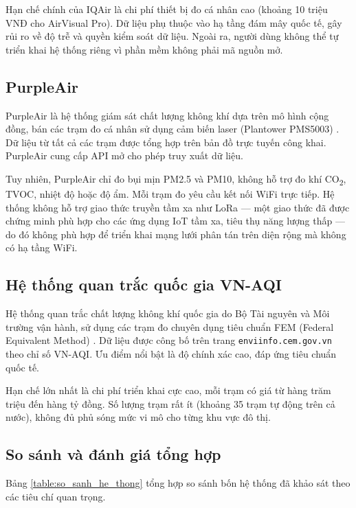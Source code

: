 \documentclass[../DoAn.tex]{subfiles}
\begin{document}
Hạn chế chính của IQAir là chi phí thiết bị đo cá nhân cao (khoảng 10 triệu VNĐ cho AirVisual Pro). Dữ liệu phụ thuộc vào hạ tầng đám mây quốc tế, gây rủi ro về độ trễ và quyền kiểm soát dữ liệu. Ngoài ra, người dùng không thể tự triển khai hệ thống riêng vì phần mềm không phải mã nguồn mở.

\subsection{PurpleAir}
\label{subsection:2.1.3}

PurpleAir là hệ thống giám sát chất lượng không khí dựa trên mô hình cộng đồng, bán các trạm đo cá nhân sử dụng cảm biến laser (Plantower PMS5003) \cite{purpleair2024}. Dữ liệu từ tất cả các trạm được tổng hợp trên bản đồ trực tuyến công khai. PurpleAir cung cấp API mở cho phép truy xuất dữ liệu.

Tuy nhiên, PurpleAir chỉ đo bụi mịn PM2.5 và PM10, không hỗ trợ đo khí CO\textsubscript{2}, TVOC, nhiệt độ hoặc độ ẩm. Mỗi trạm đo yêu cầu kết nối WiFi trực tiếp. Hệ thống không hỗ trợ giao thức truyền tầm xa như LoRa — một giao thức đã được chứng minh phù hợp cho các ứng dụng IoT tầm xa, tiêu thụ năng lượng thấp \cite{augustin2016} — do đó không phù hợp để triển khai mạng lưới phân tán trên diện rộng mà không có hạ tầng WiFi.

\subsection{Hệ thống quan trắc quốc gia VN-AQI}
\label{subsection:2.1.4}

Hệ thống quan trắc chất lượng không khí quốc gia do Bộ Tài nguyên và Môi trường vận hành, sử dụng các trạm đo chuyên dụng tiêu chuẩn FEM (Federal Equivalent Method) \cite{btnmt2023}. Dữ liệu được công bố trên trang \texttt{enviinfo.cem.gov.vn} theo chỉ số VN-AQI. Ưu điểm nổi bật là độ chính xác cao, đáp ứng tiêu chuẩn quốc tế.

Hạn chế lớn nhất là chi phí triển khai cực cao, mỗi trạm có giá từ hàng trăm triệu đến hàng tỷ đồng. Số lượng trạm rất ít (khoảng 35 trạm tự động trên cả nước), không đủ phủ sóng mức vi mô cho từng khu vực đô thị.

\subsection{So sánh và đánh giá tổng hợp}
\label{subsection:2.1.5}

Bảng \ref{table:so_sanh_he_thong} tổng hợp so sánh bốn hệ thống đã khảo sát theo các tiêu chí quan trọng.
\end{document}
